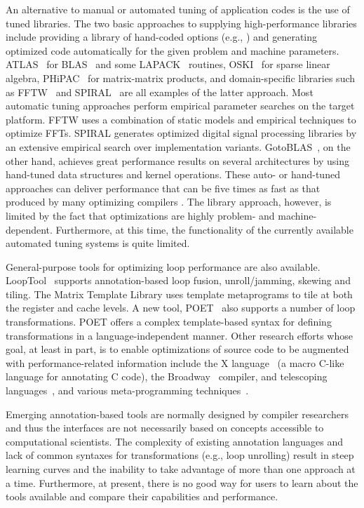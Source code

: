 An alternative to manual or automated tuning of application codes is
the use of tuned libraries. The two basic approaches to supplying
high-performance libraries include providing a library of hand-coded
options (e.g., \cite{BLAS,ESSL,Goto:2006fk}) and generating optimized
code automatically for the given problem and machine
parameters. ATLAS~\cite{atlas_sc98,WN147} for BLAS~\cite{BLAS} and
some LAPACK~\cite{laug} routines, OSKI~\cite{OSKI} for sparse linear
algebra, PHiPAC~\cite{bilmes97optimizing} for matrix-matrix products,
and domain-specific libraries such as FFTW~\cite{frigo98} and
SPIRAL~\cite{SPIRAL} are all examples of the latter approach. Most
automatic tuning approaches perform empirical parameter searches on
the target platform.  FFTW uses a combination of static models and
empirical techniques to optimize FFTs. SPIRAL generates optimized
digital signal processing libraries by an extensive empirical search
over implementation variants.  GotoBLAS~\cite{Goto:2006fk,Goto:fk}, on
the other hand, achieves great performance results on several
architectures by using hand-tuned data structures and kernel
operations.  These auto- or hand-tuned approaches can deliver
performance that can be five times as fast as that produced by many
optimizing compilers
\cite{WN147}.  The library approach, however, is limited by the fact
that optimizations are highly problem- and
machine-dependent. Furthermore, at this time, the functionality of the
currently available automated tuning systems is quite limited.


General-purpose tools for optimizing loop performance are also
available.  LoopTool~\cite{LoopTool} supports annotation-based loop
fusion, unroll/jamming, skewing and tiling.  The Matrix Template
Library \cite{Siek:1998ys} uses template metaprograms to tile at both
the register and cache levels.  A new tool, POET~\cite{POET} also
supports a number of loop transformations. POET offers a complex
template-based syntax for defining transformations in a
language-independent manner. Other research efforts whose goal, at
least in part, is to enable optimizations of source code to be
augmented with performance-related information include the X
language~\cite{XLanguage} (a macro C-like language for annotating C
code), the Broadway~\cite{broadway} compiler, and telescoping
languages~\cite{telescopingurl,teleoverview,Ken99}, and various
meta-programming
techniques~\cite{veldhuizen95,weise93,kiczales91,chiba95}.

Emerging annotation-based tools are normally designed by compiler researchers
and thus the interfaces are not necessarily based on concepts accessible to
computational scientists. The complexity of existing annotation languages and lack
of common syntaxes for transformations (e.g., loop unrolling) result
in steep learning curves and the inability to take advantage of more than one
approach at a time. Furthermore, at present, there is no good way for
users to learn about the tools available and compare their
capabilities and performance.

